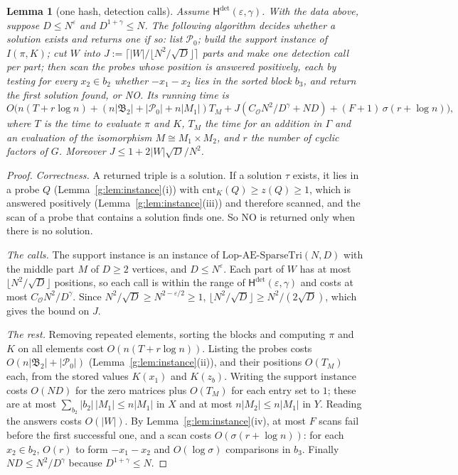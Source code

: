 \documentclass[11pt]{article}
\newtheorem{lemma}[theorem]{Lemma}
\theoremstyle{definition}
\theoremstyle{remark}
\newcommand{\Lop}{\mathrm{Lop}\text{-}\allowbreak\mathrm{AE}\text{-}\allowbreak\mathrm{SparseTri}}
\newcommand{\eps}{\varepsilon}
\newcommand{\cnt}{\mathrm{cnt}}
\newcommand{\Pq}{\mathcal{P}}
\newcommand{\Hyp}{\mathsf{H}}
\begin{document}
\begin{lemma}[one hash, detection calls]\label{g:lem:onecall}
Assume $\Hyp^{\det}(\eps,\gamma)$. With the data above, suppose $D\le N^\eps$ and $D^{1+\gamma}\le N$. The following algorithm decides whether a solution exists and returns one if so: list $\Pq_0$; build the support instance of $I(\pi,K)$; cut $W$ into $J:=\lceil|W|/\lfloor N^2/\sqrt D\rfloor\rceil$ parts and make one detection call per part; then scan the probes whose position is answered positively, each by testing for every $x_2\in b_2$ whether $-x_1-x_2$ lies in the sorted block $b_3$, and return the first solution found, or NO. Its running time is
\[
O\bigl(n(T+r\log n)+(n|\mathfrak B_2|+|\Pq_0|+n|M_1|)T_M+J(C_{\mathcal O}N^2/D^\gamma+ND)+(F+1)\,\sigma(r+\log n)\bigr),
\]
where $T$ is the time to evaluate $\pi$ and $K$, $T_M$ the time for an addition in $\Gamma$ and an evaluation of the isomorphism $M\cong M_1\times M_2$, and $r$ the number of cyclic factors of $G$. Moreover $J\le1+2|W|\sqrt D/N^2$.
\end{lemma}
\begin{proof}
\emph{Correctness.} A returned triple is a solution. If a solution $\tau$ exists, it lies in a probe $Q$ (Lemma~\ref{g:lem:instance}(i)) with $\cnt_K(Q)\ge z(Q)\ge1$, which is answered positively (Lemma~\ref{g:lem:instance}(iii)) and therefore scanned, and the scan of a probe that contains a solution finds one. So NO is returned only when there is no solution.

\emph{The calls.} The support instance is an instance of $\Lop(N,D)$ with the middle part $M$ of $D\ge2$ vertices, and $D\le N^\eps$. Each part of $W$ has at most $\lfloor N^2/\sqrt D\rfloor$ positions, so each call is within the range of $\Hyp^{\det}(\eps,\gamma)$ and costs at most $C_{\mathcal O}N^2/D^\gamma$. Since $N^2/\sqrt D\ge N^{2-\eps/2}\ge1$, $\lfloor N^2/\sqrt D\rfloor\ge N^2/(2\sqrt D)$, which gives the bound on $J$.

\emph{The rest.} Removing repeated elements, sorting the blocks and computing $\pi$ and $K$ on all elements cost $O(n(T+r\log n))$. Listing the probes costs $O(n|\mathfrak B_2|+|\Pq_0|)$ (Lemma~\ref{g:lem:instance}(ii)), and their positions $O(T_M)$ each, from the stored values $K(x_1)$ and $K(z_b)$. Writing the support instance costs $O(ND)$ for the zero matrices plus $O(T_M)$ for each entry set to $1$; these are at most $\sum_{b_2}|b_2|\,|M_1|\le n|M_1|$ in $X$ and at most $n|M_2|\le n|M_1|$ in $Y$. Reading the answers costs $O(|W|)$. By Lemma~\ref{g:lem:instance}(iv), at most $F$ scans fail before the first successful one, and a scan costs $O(\sigma(r+\log n))$: for each $x_2\in b_2$, $O(r)$ to form $-x_1-x_2$ and $O(\log\sigma)$ comparisons in $b_3$. Finally $ND\le N^2/D^\gamma$ because $D^{1+\gamma}\le N$.
\end{proof}
\end{document}

